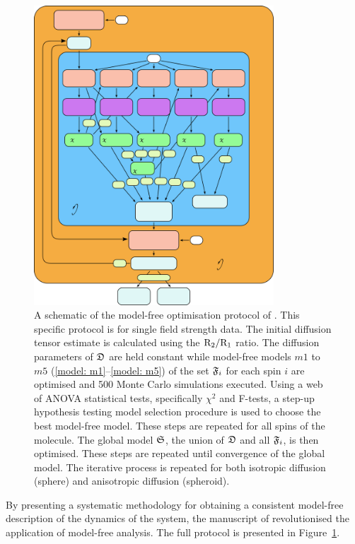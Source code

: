 \begin{htmlonly}
\begin{htmlonly}
\begin{figure}
\centerline{\includegraphics[width=0.8\textwidth, bb=0 0 436 539]{images/model_free/mandel95}}
\caption[A schematic of the model-free optimisation protocol of Mandel et al., 1995]{A schematic of the model-free optimisation protocol of \citet{Mandel95}.  This specific protocol is for single field strength data.  The initial diffusion tensor estimate is calculated using the $\mathrm{R}_2/\mathrm{R}_1$ ratio.  The diffusion parameters of $\mathfrak{D}$ are held constant while model-free models $m1$ to $m5$ (\ref{model: m1}--\ref{model: m5}) of the set $\mathfrak{F}_i$ for each spin $i$ are optimised and 500 Monte Carlo simulations executed.  Using a web of ANOVA statistical tests, specifically $\chi^2$ and F-tests, a step-up hypothesis testing model selection procedure is used to choose the best model-free model.  These steps are repeated for all spins of the molecule.  The global model $\mathfrak{S}$, the union of $\mathfrak{D}$ and all $\mathfrak{F}_i$, is then optimised.  These steps are repeated until convergence of the global model.  The iterative process is repeated for both isotropic diffusion (sphere) and anisotropic diffusion (spheroid).} \label{fig: Mandel et al.}
\end{figure}

By presenting a systematic methodology for obtaining a consistent model-free description of the dynamics of the system, the manuscript of \citet{Mandel95} revolutionised the application of model-free analysis.  The full protocol is presented in Figure~\ref{fig: Mandel et al.}.


\end{htmlonly}
\end{htmlonly}
